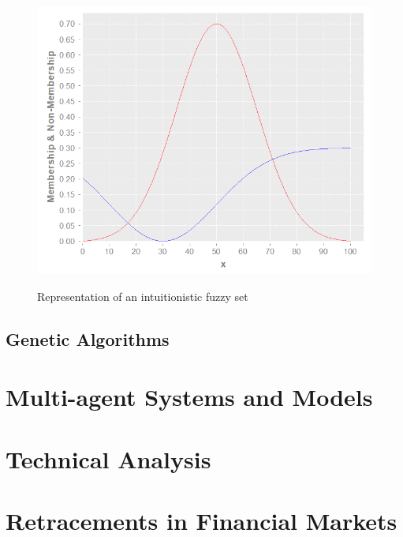 \begin{figure}
\caption{Representation of an intuitionistic fuzzy set}
\centering
\includegraphics[width=1.0\textwidth]{img/example-of-ifs.png}
\label{figure:example-of-ifs}
\end{figure}

\subsection{Genetic Algorithms}
\label{subsection:genetic-algorithms}

\section{Multi-agent Systems and Models}
\label{section:multi-agent-systems-and-models}

\section{Technical Analysis}
\label{section:technical-analysis}

\section{Retracements in Financial Markets}
\label{section:retracements-in-financial-markets}

